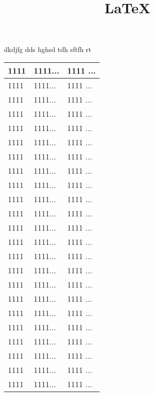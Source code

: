 \documentclass[11pt,a4paper]{article}
\title{LaTeX}    %
\author{}
\date{}
\begin{document}
  \maketitle
dkdjfg
dds
hghsd
tdh
sftfh
rt

\begin{tabular}{|l|l|l|} %
\hline %
1111 & 1111... &1111 ... \\     %
\hline %
1111 & 1111... & 1111 ... \\	%
1111 & 1111... & 1111 ... \\
1111 & 1111... &1111 ... \\
1111 & 1111... &1111 ... \\
1111 & 1111... &1111 ... \\
1111 & 1111... &1111 ... \\
1111 & 1111... &1111 ... \\
1111 & 1111... &1111 ... \\
1111 & 1111... &1111 ... \\
1111 & 1111... &1111 ... \\
1111 & 1111... &1111 ... \\
1111 & 1111... &1111 ... \\
1111 & 1111... &1111 ... \\
1111 & 1111... &1111 ... \\
1111 & 1111... &1111 ... \\
1111 & 1111... &1111 ... \\
1111 & 1111... &1111 ... \\
1111 & 1111... &1111 ... \\
1111 & 1111... &1111 ... \\
1111 & 1111... &1111 ... \\
1111 & 1111... &1111 ... \\
1111 & 1111... &1111 ... \\
\hline %
\end{tabular}
\end{document}
